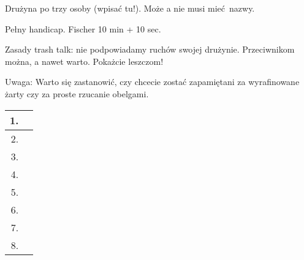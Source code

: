 


\subtitle{Zapisy na turniej \sout{Rengo} Trash Talk}

\medskip

Drużyna po trzy osoby (wpisać tu!). Może a nie musi mieć nazwy.

Pełny handicap. Fischer 10 min + 10 sec.

\bigskip

Zasady trash talk: nie podpowiadamy ruchów swojej drużynie.
Przeciwnikom można, a nawet warto. Pokażcie leszczom!

\bigskip

Uwaga: Warto się zastanowić, czy chcecie zostać zapamiętani za wyrafinowane żarty czy za proste rzucanie obelgami.

\bigskip

\setlength{\extrarowheight}{22pt}
\begin{tabularx}{\textwidth}{| r X |}
\hline
1. & \\ \hline
2. & \\ \hline
3. & \\ \hline
4. & \\ \hline
5. & \\ \hline
6. & \\ \hline
7. & \\ \hline
8. & \\ \hline
\end{tabularx}


